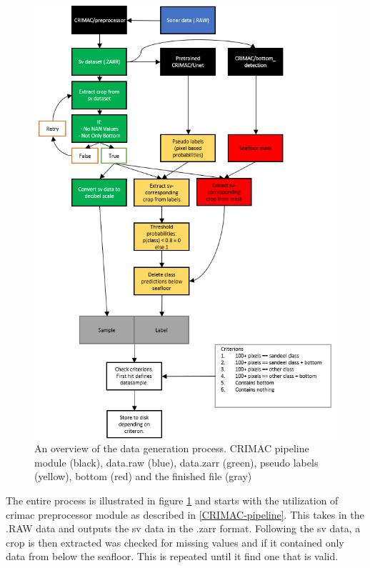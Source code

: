         \begin{figure}[H]
            \centering
            \includegraphics[scale=0.8]{figures/flow_data_gen.png}
            \caption{An overview of the data generation process. CRIMAC pipeline module (black), data.raw (blue), data.zarr (green), pseudo labels (yellow), bottom (red) and the finished file (gray)}
          	\medskip 
            \label{data_generation_flowchart_fig}
        \end{figure}
        
        The entire process is illustrated in figure \ref{data_generation_flowchart_fig} and starts with the utilization of \gls{crimac} preprocessor module as described in \ref{CRIMAC-pipeline}. This takes in the .RAW data and outputs the sv data in the .zarr format. Following the \gls{sv} data, a crop is then extracted was checked for missing values and if it contained only data from below the seafloor. This is repeated until it find one that is valid. 
        
